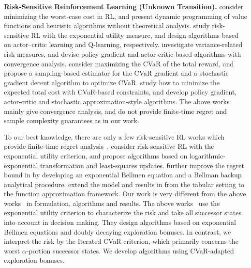 

\textbf{Risk-Sensitive Reinforcement Learning (Unknown Transition).} 
\cite{heger1994consideration,coraluppi1997mixed,coraluppi1999risk} consider minimizing the worst-case cost in RL, and present dynamic programming of value functions and heuristic algorithms without theoretical analysis.
\cite{borkar2001sensitivity,borkar2002q} study risk-sensitive RL with the exponential utility measure, and design algorithms based on actor–critic learning and Q-learning, respectively.
\cite{di2012policy,la2013actor} investigate variance-related risk measures, and devise policy gradient and actor-critic-based algorithms with convergence analysis. \cite{tamar2015optimizing} consider maximizing the CVaR of the total reward, and propose a sampling-based estimator for the CVaR gradient and a stochastic gradient decent algorithm to optimize CVaR.
\cite{borkar2014risk,chow2014algorithms,chow2017risk} study how to minimize the expected total cost with CVaR-based constraints, and develop policy gradient, actor-critic and stochastic approximation-style algorithms.
The above works mainly give convergence analysis, and do not provide finite-time regret and sample complexity guarantees as in our work. 

To our best knowledge, there are only a few risk-sensitive RL works which provide finite-time regret analysis~\citep{fei2020near_optimal,fei2021exponential,fei2021function_approx}.
\cite{fei2020near_optimal} consider risk-sensitive RL with the exponential utility criterion, and propose algorithms based on logarithmic-exponential transformation and least-squares updates. \cite{fei2021exponential} further improve the regret bound in \citep{fei2020near_optimal} by developing an exponential Bellmen equation and a Bellman backup analytical procedure.
\cite{fei2021function_approx} extend the model and results in \citep{fei2020near_optimal,fei2021exponential} from the tabular setting to the function approximation framework. 
Our work is very different from the above works~\citep{fei2020near_optimal,fei2021exponential,fei2021function_approx} in formulation, algorithms and results.
The above works~\citep{fei2020near_optimal,fei2021exponential,fei2021function_approx} use the exponential utility criterion to characterize the risk and take all successor states into account in decision making. They design algorithms based on exponential Bellmen equations and doubly decaying exploration bonuses.
In contrast, we interpret the risk by the Iterated CVaR criterion, which primarily concerns the worst $\alpha$-portion successor states. We develop algorithms using CVaR-adapted exploration bonuses.

